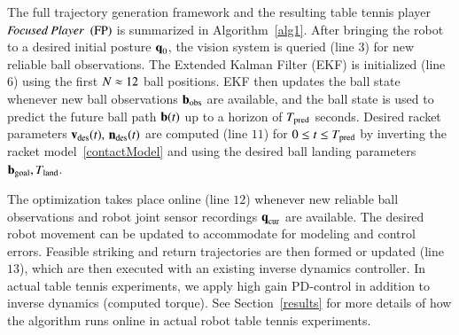 The full trajectory generation framework and the resulting table tennis player $\emph{Focused Player}$ $(\mathrm{FP})$ is summarized in Algorithm~\ref{alg1}. %
After bringing the robot to a desired initial posture $\boldsymbol{\mathrm{q}}_0$, the vision system is queried (line $3$) for new reliable ball observations. The Extended Kalman Filter (EKF) is initialized (line $6$) using the first $N \approx 12$ ball positions. EKF then updates the ball state whenever new ball observations $\boldsymbol{\mathrm{b}}_{\mathrm{obs}}$ are available, and the ball state is used to predict the future ball path $\boldsymbol{\mathrm{b}}(t)$ up to a horizon of $T_{\mathrm{pred}}$ seconds. Desired racket parameters $\boldsymbol{\mathrm{v}}_{\mathrm{des}}(t), \, \boldsymbol{\mathrm{n}}_{\mathrm{des}}(t)$ are computed (line $11$) for $0 \leq t \leq T_{\mathrm{pred}}$ by inverting the racket model~\eqref{contactModel} and using the desired ball landing parameters $\boldsymbol{\mathrm{b}}_{\mathrm{goal}}, T_{\mathrm{land}}$. 

The optimization takes place online (line $12$) whenever new reliable ball observations and robot joint sensor recordings $\boldsymbol{\mathrm{q}}_{\mathrm{cur}}$ are available. The desired robot movement can be updated to accommodate for modeling and control errors. Feasible striking and return trajectories are then formed or updated (line $13$), which are then executed with an existing inverse dynamics controller. In actual table tennis experiments, we apply high gain PD-control in addition to inverse dynamics (computed torque). See Section~\ref{results} for more details of how the algorithm runs online in actual robot table tennis experiments.